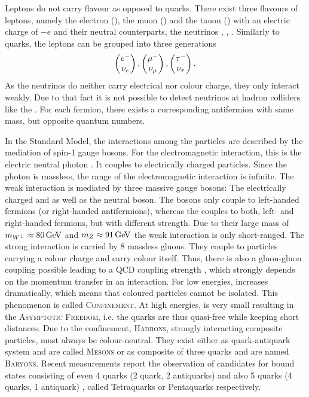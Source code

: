 Leptons do not carry flavour as opposed to quarks.
There exist three flavours of leptons, namely the electron (\en), the muon (\mun) and the tauon (\taum) with an electric charge of $-e$ and their neutral counterparts, the neutrinos \neue, \neum, \neut.
Similarly to quarks, the leptons can be grouped into three generations
\begin{align*}
    \begin{pmatrix} {\ensuremath{e^-}} \\ {{\nu}_e} \end{pmatrix},
    \begin{pmatrix} {\ensuremath{\mu^-}} \\ {{\nu}_\mu} \end{pmatrix},
    \begin{pmatrix} {\ensuremath{\tau^-}} \\ {{\nu}_\tau} \end{pmatrix}.
\end{align*}
As the neutrinos do neither carry electrical nor colour charge, they only interact weakly.
Due to that fact it is not possible to detect neutrinos at hadron colliders like the \lhc.
For each fermion, there exists a corresponding antifermion with same mass, but opposite quantum numbers.

In the Standard Model, the interactions among the particles are described by the mediation of spin-1 gauge bosons.
For the electromagnetic interaction, this is the electric neutral photon \g.
It couples to electrically charged particles.
Since the photon is massless, the range of the electromagnetic interaction is infinite.
The weak interaction is mediated by three massive gauge bosons:
The electrically charged \Wp and \Wm as well as the neutral \Z boson.
The \Wpm bosons only couple to left-handed fermions (or right-handed antifermions), whereas the \Z couples to both, left- and right-handed fermions, but with different strength.
Due to their large mass of $m_{{W^\pm}} \approx 80 \mathrm{\,Ge\kern -0.1em V}$ and $m_{Z} \approx 91 \mathrm{\,Ge\kern -0.1em V}$ the weak interaction is only short-ranged.
The strong interaction is carried by 8 massless gluons.
They couple to particles carrying a colour charge and carry colour itself.
Thus, there is also a gluon-gluon coupling possible leading to a QCD coupling strength \as, which strongly depends on the momentum transfer in an interaction.
For low energies, \as increases dramatically, which means that coloured particles cannot be isolated.
This phenomenon is called \textsc{Confinement}.
At high energies, \as is very small resulting in the \textsc{Asymptotic Freedom}, i.e. the quarks are thus quasi-free while keeping short distances.
Due to the confinement, \textsc{Hadrons}, strongly interacting composite particles, must always be colour-neutral.
They exist either as quark-antiquark system and are called \textsc{Mesons} or as composite of three quarks and are named \textsc{Baryons}.
Recent \lhcb measurements report the observation of candidates for bound states consisting of even 4 quarks (2 quark, 2 antiquarks) \cite{Tetraquark} and also 5 quarks (4 quarks, 1 antiquark) \cite{Pentaquark}, called Tetraquarks or Pentaquarks respectively.

